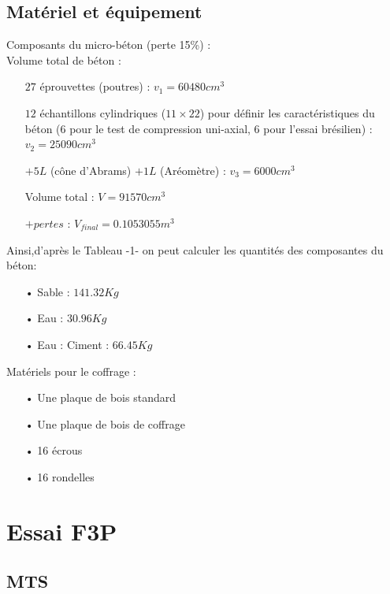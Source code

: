 \documentclass{DGC_M2_report}
\begin{document}
\section{Matériel et équipement}
Composants du micro-béton (perte 15\%) :\\
Volume total de béton :\\
\begin{itemize} 
\item[\triangleright] $27$ éprouvettes (poutres) : $v_1 = 60480 cm^3$
\item[\triangleright] $12$ échantillons cylindriques ($11\times 22$) pour définir les caractéristiques du béton (6 pour le
   test de compression uni-axial, 6 pour l’essai brésilien) : $v_2 = 25090 cm^3$
\item[\triangleright] $+5L$ (cône d’Abrams) $+1L$ (Aréomètre) : $v_3 = 6000 cm^3$
\item[\triangleright] Volume total : $V = 91570 cm^3$
\item[\triangleright] $+pertes$ : $V_{final} = 0.1053055 m^3$\\
\end{itemize}
Ainsi,d’après le Tableau -1- on peut calculer les quantités des composantes du béton:\\
\begin{itemize}
\item[•] Sable : $141.32 Kg$
\item[•] Eau : $30.96 Kg$
\item[•] Eau : Ciment : $66.45 Kg$\\
\end{itemize}
Matériels pour le coffrage :\\
\begin{itemize}
\item[•] Une plaque de bois standard
\item[•] Une plaque de bois de coffrage
\item[•] 16 écrous
\item[•] 16 rondelles
\end{itemize}





\chapter{Essai F3P}
\section{MTS}
\end{document}
